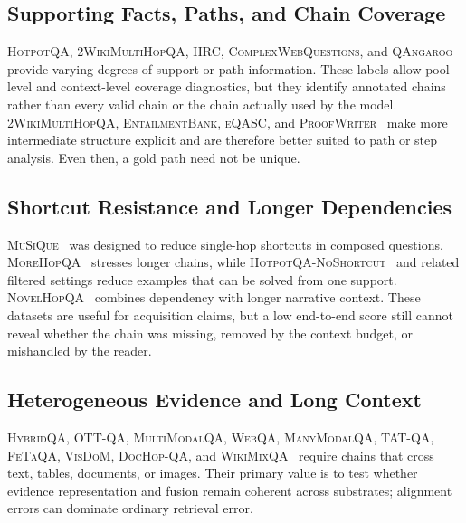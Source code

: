 \documentclass[manuscript,review]{acmart}
\theoremstyle{definition}
\theoremstyle{plain}
\theoremstyle{remark}
\begin{document}
\subsection{Supporting Facts, Paths, and Chain Coverage}
\label{subsec:coverage_diagnostics}

\textsc{HotpotQA}, \textsc{2WikiMultiHopQA}, \textsc{IIRC},
\textsc{ComplexWebQuestions}, and \textsc{QAngaroo}~\cite{yang2018hotpotqa,ho2020wikimultihopqa,ferguson2020iirc,talmor2018complexwebquestions,welbl2018qangaroo}
provide varying degrees of support or path information. These labels allow
pool-level and context-level coverage diagnostics, but they identify
annotated chains rather than every valid chain or the chain actually used by
the model. \textsc{2WikiMultiHopQA}, \textsc{EntailmentBank},
\textsc{eQASC}, and \textsc{ProofWriter}~\cite{ho2020wikimultihopqa,dalvi2021entailmentbank,jhamtani2020eqasc,tafjord2021proofwriter}
make more intermediate structure explicit and are therefore better suited to
path or step analysis. Even then, a gold path need not be unique.

\subsection{Shortcut Resistance and Longer Dependencies}
\label{subsec:shortcut_diagnostics}

\textsc{MuSiQue}~\cite{trivedi2022musique} was designed to reduce
single-hop shortcuts in composed questions. \textsc{MoreHopQA}~\cite{schnitzler2024morehopqa}
stresses longer chains, while \textsc{HotpotQA-NoShortcut}~\cite{trivedi2020nohotpot}
and related filtered settings reduce examples that can be solved from one
support. \textsc{NovelHopQA}~\cite{novelhopqa2025} combines dependency with
longer narrative context. These datasets are useful for acquisition claims,
but a low end-to-end score still cannot reveal whether the chain was missing,
removed by the context budget, or mishandled by the reader.

\subsection{Heterogeneous Evidence and Long Context}
\label{subsec:hetero_diagnostics}

\textsc{HybridQA}, \textsc{OTT-QA}, \textsc{MultiModalQA},
\textsc{WebQA}, \textsc{ManyModalQA}, \textsc{TAT-QA},
\textsc{FeTaQA}, \textsc{VisDoM}, \textsc{DocHop-QA}, and
\textsc{WikiMixQA}~\cite{chen2020hybridqa,chen2021opentableqa,talmor2021multimodalqa,chang2022webqa,hannan2020manymodalqa,zhu2021tatqa,nan2022fetaqa,wang2024visdom,suri2024dochop,he2024wikimixqa}
require chains that cross text, tables, documents, or images. Their primary
value is to test whether evidence representation and fusion remain coherent
across substrates; alignment errors can dominate ordinary retrieval error.
\end{document}
